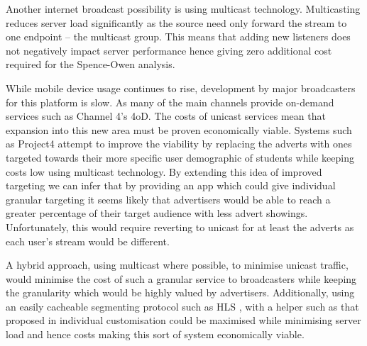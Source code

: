 	Another internet broadcast possibility is using multicast technology\citep{multicast}. Multicasting reduces server load significantly as the source need only forward the stream to one endpoint -- the multicast group. This means that adding new listeners does not negatively impact server performance hence giving zero additional cost required for the Spence-Owen analysis\citep{broadcastEconomics}.

	While mobile device usage continues to rise, development by major broadcasters for this platform is slow. As many of the main channels provide on-demand services such as Channel 4's 4oD. The costs of unicast services mean that expansion into this new area must be proven economically viable. Systems such as Project4 attempt to improve the viability by replacing the adverts with ones targeted towards their more specific user demographic of students while keeping costs low using multicast technology. By extending this idea of improved targeting we can infer that by providing an app which could give individual granular targeting it seems likely that advertisers would be able to reach a greater percentage of their target audience with less advert showings. Unfortunately, this would require reverting to unicast for at least the adverts as each user's stream would be different.

	A hybrid approach, using multicast where possible, to minimise unicast traffic, would minimise the cost of such a granular service to broadcasters while keeping the granularity which would be highly valued by advertisers. Additionally, using an easily cacheable segmenting protocol such as HLS \citep{HLS}, with a helper such as that proposed in \citep{cachedStream} individual customisation could be maximised while minimising server load and hence costs making this sort of system economically viable.
